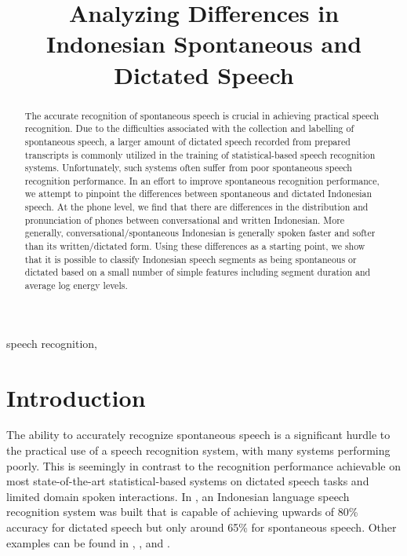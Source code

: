 \documentclass[conference]{IEEEtran}
\begin{document}
\title{Analyzing Differences in Indonesian Spontaneous and Dictated Speech}

\author {
}

\maketitle

\begin{abstract}
The accurate recognition of spontaneous speech is crucial in achieving practical speech recognition.
Due to the difficulties associated with the collection and labelling of spontaneous speech, a larger amount of dictated speech recorded from prepared transcripts is commonly utilized in the training of statistical-based speech recognition systems.
Unfortunately, such systems often suffer from poor spontaneous speech recognition performance.
In an effort to improve spontaneous recognition performance, we attempt to pinpoint the differences between spontaneous and dictated Indonesian speech.
At the phone level, we find that there are differences in the distribution and pronunciation of phones between conversational and written Indonesian.
More generally, conversational/spontaneous Indonesian is generally spoken faster and softer than its written/dictated form.
Using these differences as a starting point, we show that it is possible to classify Indonesian speech segments as being spontaneous or dictated based on a small number of simple features including segment duration and average log energy levels.
\end{abstract}

\begin{IEEEkeywords}
speech recognition, 
\end{IEEEkeywords}

\IEEEpeerreviewmaketitle

\section{Introduction}
The ability to accurately recognize spontaneous speech is a significant hurdle to the practical use of a speech recognition system, with many systems performing poorly.
This is seemingly in contrast to the recognition performance achievable on most state-of-the-art statistical-based systems on dictated speech tasks and limited domain spoken interactions.
In \cite{hoesen}, an Indonesian language speech recognition system was built that is capable of achieving upwards of 80\% accuracy for dictated speech but only around 65\% for spontaneous speech.
Other examples can be found in \cite{}, \cite{}, and \cite{}.
\end{document}
